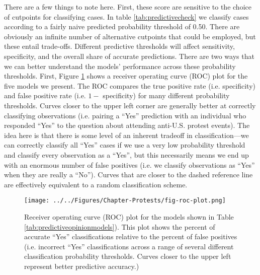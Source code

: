 There are a few things to note here. First, these score are sensitive to the choice of cutpoints for classifying cases. In table \ref{tab:predictivecheck} we classify cases according to a fairly naive predicted probability threshold of 0.50. There are obviously an infinite number of alternative cutpoints that could be employed, but these entail trade-offs. Different predictive thresholds will affect sensitivity, specificity, and the overall share of accurate predictions. There are two ways that we can better understand the models' performance across these probability thresholds. First, Figure \ref{fig:protest-roc-plot} shows a receiver operating curve (ROC) plot for the five models we present. The ROC compares the true positive rate (i.e. specificity) and false positive rate (i.e. $1-$ specificity) for many different probability thresholds. Curves closer to the upper left corner are generally better at correctly classifying observations (i.e. pairing a ``Yes'' prediction with an individual who responded ``Yes'' to the question about attending anti-U.S. protest events). The idea here is that there is some level of an inherent tradeoff in classification---we can correctly classify all ``Yes'' cases if we use a very low probability threshold and classify every observation as a ``Yes'', but this necessarily means we end up with an enormous number of false positives (i.e. we classify observations as ``Yes'' when they are really a ``No''). Curves that are closer to the dashed reference line are effectively equivalent to a random classification scheme.


\begin{figure}[t]
	\centering\texttt{[image: ../../Figures/Chapter-Protests/fig-roc-plot.png]}
	\caption{Receiver operating curve (ROC) plot for the models shown in Table \ref{tab:predictiveopinionmodels}). This plot shows the percent of accurate ``Yes'' classifications relative to the percent of false positives (i.e. incorrect ``Yes'' classifications across a range of several different classification probability thresholds. Curves closer to the upper left represent better predictive accuracy.)}
	\label{fig:protest-roc-plot}
\end{figure}

